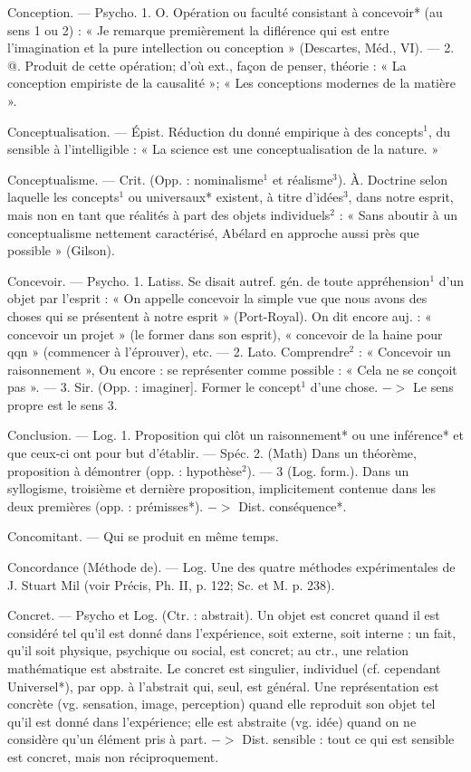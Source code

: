 Conception. — Psycho. 1. O. Opération ou faculté consistant à concevoir* (au sens 1 ou 2) : « Je remarque
premièrement la diflérence qui est
entre l'imagination et la pure intellection ou conception » (Descartes,
Méd., VI). — 2. @. Produit de cette
opération; d’où ext., façon de penser,
théorie : « La conception empiriste
de la causalité »; « Les conceptions
modernes de la matière ».

Conceptualisation. — Épist. Réduction
du donné empirique à des concepts$^1$,
du sensible à l'intelligible : « La
science est une conceptualisation de
la nature. »

Conceptualisme. — Crit. (Opp. : nominalisme$^1$ et réalisme$^3$). À. Doctrine
selon laquelle les concepts$^1$ ou universaux* existent, à titre d'idées$^3$,
dans notre esprit, mais non en tant
que réalités à part des objets individuels$^2$ : « Sans aboutir à un conceptualisme nettement caractérisé, Abélard en approche aussi près que possible » (Gilson).

Concevoir. — Psycho. 1. Latiss. Se
disait autref. gén. de toute appréhension$^1$ d’un objet par l'esprit : « On
appelle concevoir la simple vue que
nous avons des choses qui se présentent
à notre esprit » (Port-Royal).
On dit encore auj. : « concevoir un
projet » (le former dans son esprit),
« concevoir de la haine pour qqn »
(commencer à l’éprouver), etc. —
2. Lato. Comprendre$^2$ : « Concevoir
un raisonnement », Ou encore : se
représenter comme possible : « Cela
ne se conçoit pas ». — 3. Sir. (Opp. :
imaginer]. Former le concept$^1$ d’une
chose. $->$ Le sens propre est le
sens 3.

Conclusion. — Log. 1. Proposition
qui clôt un raisonnement* ou une
inférence* et que ceux-ci ont pour
but d'établir. — Spéc. 2. (Math)
Dans un théorème, proposition à
démontrer (opp. : hypothèse$^2$). —
3 (Log. form.). Dans un syllogisme, troisième et dernière proposition, implicitement contenue dans
les deux premières (opp. : prémisses*). $->$ Dist. conséquence*.

Concomitant. — Qui se produit en
même temps.

Concordance (Méthode de). — Log.
Une des quatre méthodes expérimentales de J. Stuart Mil (voir
Précis, Ph. II, p. 122; Sc. et M.
p. 238).

Concret. — Psycho et Log. (Ctr. :
abstrait). Un objet est concret quand
il est considéré tel qu'il est donné
dans l’expérience, soit externe, soit
interne : un fait, qu'il soit physique,
psychique ou social, est concret; au
ctr., une relation mathématique est
abstraite. Le concret est singulier,
individuel (cf. cependant Universel*),
par opp. à l’abstrait qui, seul, est
général. Une représentation est concrète (vg. sensation, image, perception) quand elle reproduit son
objet tel qu'il est donné dans l’expérience; elle est abstraite (vg. idée)
quand on ne considère qu’un élément pris à part. $->$ Dist. sensible : tout ce qui est sensible est
concret, mais non réciproquement.

